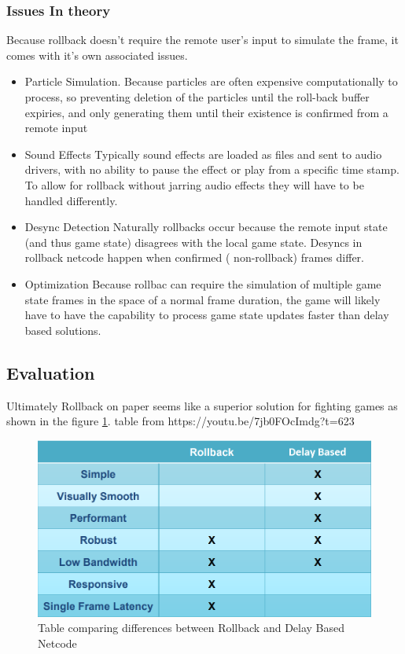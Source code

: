 \documentclass{entcs}
\begin{document}
\subsubsection{Issues In theory}
Because rollback doesn't require the remote user's input to simulate the frame, it comes with it's own associated issues.
\begin{itemize}
\item Particle Simulation.
Because particles are often expensive computationally to process, so preventing deletion of the particles until the roll-back buffer expiries, and only generating them until their existence is confirmed from a remote input
\item Sound Effects
Typically sound effects are loaded as files and sent to audio drivers, with no ability to pause the effect or play from a specific time stamp. To allow for rollback without jarring audio effects they will have to be handled differently.
\item Desync Detection
Naturally rollbacks occur because the remote input state (and thus game state) disagrees with the local game state. Desyncs in rollback netcode happen when confirmed ( non-rollback) frames differ.
\item Optimization
Because rollbac can require the simulation of multiple game state frames in the space of a normal frame duration, the game will likely have to have the capability to process game state updates faster than delay based solutions.
\end{itemize}
\subsection{Evaluation}
Ultimately Rollback on paper seems like a superior solution for fighting games as shown in the figure \ref{fig:NetcodeCompare}.  
table from {https://youtu.be/7jb0FOcImdg?t=623}

\begin{figure}[h]
\centering
\includegraphics[width=\textwidth]{NetcodeCompare}
\caption{Table comparing differences between Rollback and Delay Based Netcode\cite{8Frames}}
\label{fig:NetcodeCompare}
\end{figure}
\end{document}
